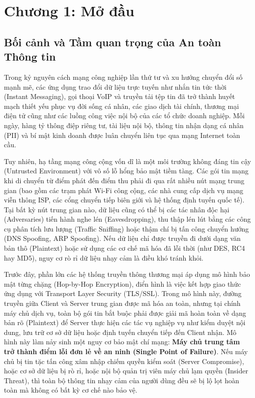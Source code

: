 \documentclass[a4paper,12pt]{article}
\begin{document}
\pagestyle{fancy}
\newpage
\tableofcontents
\newpage
{}

\section{Chương 1: Mở đầu}

\subsection{Bối cảnh và Tầm quan trọng của An toàn Thông tin}
Trong kỷ nguyên cách mạng công nghiệp lần thứ tư và xu hướng chuyển đổi số mạnh mẽ, các ứng dụng trao đổi dữ liệu trực tuyến như nhắn tin tức thời (Instant Messaging), gọi thoại VoIP và truyền tải tệp tin đã trở thành huyết mạch thiết yếu phục vụ đời sống cá nhân, các giao dịch tài chính, thương mại điện tử cũng như các luồng công việc nội bộ của các tổ chức doanh nghiệp. Mỗi ngày, hàng tỷ thông điệp riêng tư, tài liệu nội bộ, thông tin nhận dạng cá nhân (PII) và bí mật kinh doanh được luân chuyển liên tục qua mạng Internet toàn cầu.

Tuy nhiên, hạ tầng mạng công cộng vốn dĩ là một môi trường không đáng tin cậy (Untrusted Environment) với vô số lỗ hổng bảo mật tiềm tàng. Các gói tin mạng khi di chuyển từ điểm phát đến điểm thu phải đi qua rất nhiều nút mạng trung gian (bao gồm các trạm phát Wi-Fi công cộng, các nhà cung cấp dịch vụ mạng viễn thông ISP, các cổng chuyển tiếp biên giới và hệ thống định tuyến quốc tế). Tại bất kỳ nút trung gian nào, dữ liệu cũng có thể bị các tác nhân độc hại (Adversaries) tiến hành nghe lén (Eavesdropping), thu thập lén lút bằng các công cụ phân tích lưu lượng (Traffic Sniffing) hoặc thậm chí bị tấn công chuyển hướng (DNS Spoofing, ARP Spoofing). Nếu dữ liệu chỉ được truyền đi dưới dạng văn bản thô (Plaintext) hoặc sử dụng các cơ chế mã hóa đã lỗi thời (như DES, RC4 hay MD5), nguy cơ rò rỉ dữ liệu nhạy cảm là điều khó tránh khỏi.

Trước đây, phần lớn các hệ thống truyền thông thương mại áp dụng mô hình bảo mật từng chặng (Hop-by-Hop Encryption), điển hình là việc kết hợp giao thức ứng dụng với Transport Layer Security (TLS/SSL). Trong mô hình này, đường truyền giữa Client và Server trung gian được mã hóa an toàn, nhưng tại chính máy chủ dịch vụ, toàn bộ gói tin bắt buộc phải được giải mã hoàn toàn về dạng bản rõ (Plaintext) để Server thực hiện các tác vụ nghiệp vụ như kiểm duyệt nội dung, lưu trữ cơ sở dữ liệu hoặc định tuyến chuyển tiếp đến Client nhận. Mô hình này làm nảy sinh một nguy cơ bảo mật chí mạng: \textbf{Máy chủ trung tâm trở thành điểm lỗi đơn lẻ về an ninh (Single Point of Failure)}. Nếu máy chủ bị tin tặc tấn công xâm nhập chiếm quyền kiểm soát (Server Compromise), hoặc cơ sở dữ liệu bị rò rỉ, hoặc nội bộ quản trị viên máy chủ lạm quyền (Insider Threat), thì toàn bộ thông tin nhạy cảm của người dùng đều sẽ bị lộ lọt hoàn toàn mà không có bất kỳ cơ chế nào bảo vệ.
\end{document}
